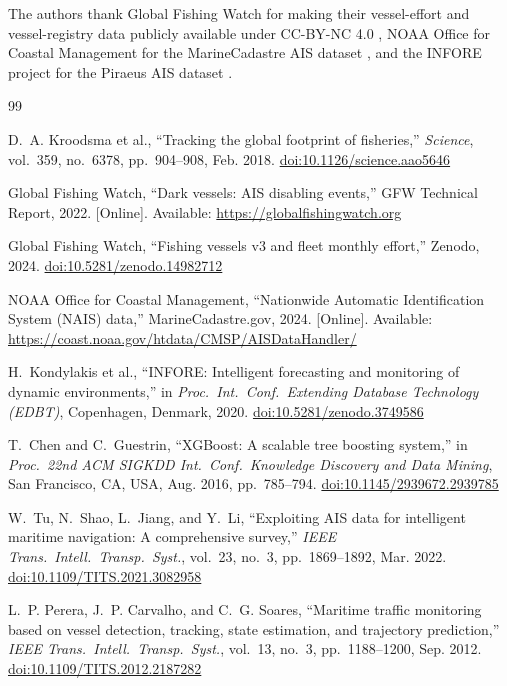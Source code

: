 \documentclass[journal]{IEEEtran}
\newcommand{\doi}[1]{\href{https://doi.org/#1}{doi:#1}}
\begin{document}
The authors thank Global Fishing Watch for making their vessel-effort and
vessel-registry data publicly available under CC-BY-NC 4.0
\cite{gfw_zenodo2024}, NOAA Office for Coastal Management for the
MarineCadastre AIS dataset \cite{noaa_ais2024}, and the INFORE project
for the Piraeus AIS dataset \cite{kondylakis2020infore}.


\begin{thebibliography}{99}

D.~A. Kroodsma et al.,
``Tracking the global footprint of fisheries,''
\textit{Science}, vol.~359, no.~6378, pp.~904--908, Feb. 2018.
\doi{10.1126/science.aao5646}

Global Fishing Watch,
``Dark vessels: AIS disabling events,''
GFW Technical Report, 2022.
[Online]. Available: \url{https://globalfishingwatch.org}

Global Fishing Watch,
``Fishing vessels v3 and fleet monthly effort,''
Zenodo, 2024.
\doi{10.5281/zenodo.14982712}

NOAA Office for Coastal Management,
``Nationwide Automatic Identification System (NAIS) data,''
MarineCadastre.gov, 2024.
[Online]. Available: \url{https://coast.noaa.gov/htdata/CMSP/AISDataHandler/}

H.~Kondylakis et al.,
``INFORE: Intelligent forecasting and monitoring of dynamic environments,''
in \textit{Proc.\ Int.\ Conf.\ Extending Database Technology (EDBT)},
Copenhagen, Denmark, 2020.
\doi{10.5281/zenodo.3749586}

T.~Chen and C.~Guestrin,
``XGBoost: A scalable tree boosting system,''
in \textit{Proc.\ 22nd ACM SIGKDD Int.\ Conf.\ Knowledge Discovery and
Data Mining}, San Francisco, CA, USA, Aug. 2016, pp.~785--794.
\doi{10.1145/2939672.2939785}

W.~Tu, N.~Shao, L.~Jiang, and Y.~Li,
``Exploiting AIS data for intelligent maritime navigation: A comprehensive
survey,''
\textit{IEEE Trans.\ Intell.\ Transp.\ Syst.}, vol.~23, no.~3,
pp.~1869--1892, Mar. 2022.
\doi{10.1109/TITS.2021.3082958}

L.~P. Perera, J.~P. Carvalho, and C.~G. Soares,
``Maritime traffic monitoring based on vessel detection, tracking,
state estimation, and trajectory prediction,''
\textit{IEEE Trans.\ Intell.\ Transp.\ Syst.}, vol.~13, no.~3,
pp.~1188--1200, Sep. 2012.
\doi{10.1109/TITS.2012.2187282}


\end{thebibliography}
\end{document}
